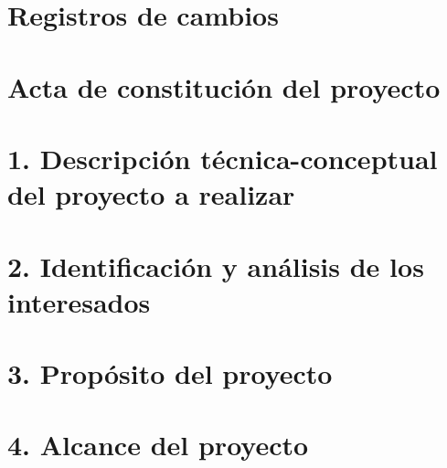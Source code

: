 \documentclass[
11pt, %
codirector, %
]{charter}
\begin{document}
\renewcommand{\listtablename}{Índice de tablas}
\renewcommand{\tablename}{Tabla}

\maketitle
\thispagestyle{empty}
\pagebreak

\thispagestyle{empty}
{\setlength{\parskip}{0pt}
	\tableofcontents{}
}
\pagebreak

\section*{Registros de cambios}
\label{sec:registro}



\pagebreak

\section*{Acta de constitución del proyecto}
\label{sec:acta}



\section{1. Descripción técnica-conceptual del proyecto a realizar}
\label{sec:descripcion}



\section{2. Identificación y análisis de los interesados}
\label{sec:interesados}



\section{3. Propósito del proyecto}
\label{sec:proposito}



\section{4. Alcance del proyecto}
\label{sec:alcance}
\end{document}
